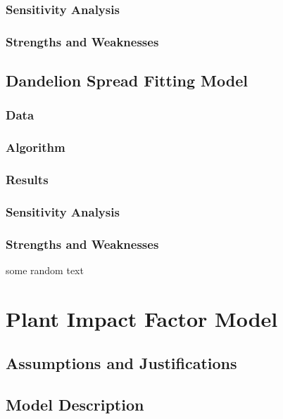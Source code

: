 \documentclass[12pt]{article}
\begin{document}
		\subsubsection{Sensitivity Analysis}
		
		\subsubsection{Strengths and Weaknesses}
		
	\subsection{Dandelion Spread Fitting Model}
		
		\subsubsection{Data}
		
		\subsubsection{Algorithm}
		
		\subsubsection{Results}
		
		\subsubsection{Sensitivity Analysis}
		
		\subsubsection{Strengths and Weaknesses}
	
		some random text
		
\section{Plant Impact Factor Model}

	\subsection{Assumptions and Justifications}
	
	\subsection{Model Description}
\end{document}
